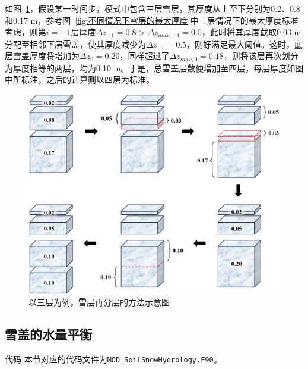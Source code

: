 如图~\ref{fig:以三层为例雪层再分层的方法}，假设某一时间步，模式中包含三层雪层，其厚度从上至下分别为0.2、0.8和0.17 m，参考图~\ref{fig:不同情况下雪层的最大厚度}中三层情况下的最大厚度标准考虑，则第$i=-1$层厚度$\Delta z_{-1}=0.8 > \Delta z_{max,-1}=0.5 $，此时将其厚度截取0.03 m分配至相邻下层雪盖，使其厚度减少为$\Delta z_{-1}=0.5$，刚好满足最大阈值。这时，底层雪盖厚度将增加为$\Delta z_{0}=0.20$，同样超过了$\Delta z_{max,0}=0.18$，则将该层再次划分为厚度相等的两层，均为0.10 m。于是，总雪盖层数便增加至四层，每层厚度如图中所标注，之后的计算则以四层为标准。

{
\begin{figure}[htbp]
\centering
\includegraphics[width=0.6\columnwidth]{Figures/雪盖土壤热力过程/以三层为例雪层再分层的方法.png}
\caption{以三层为例，雪层再分层的方法示意图}
\label{fig:以三层为例雪层再分层的方法}
\end{figure}
}


\subsection{雪盖的水量平衡}\label{雪盖的水量平衡}
\begin{mymdframed}{代码}
本节对应的代码文件为\texttt{MOD\_SoilSnowHydrology.F90}。
\end{mymdframed}


